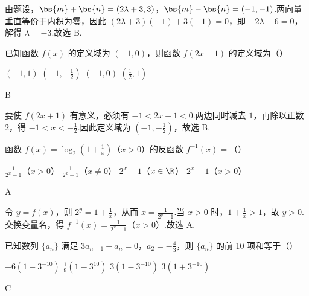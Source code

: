\begin{solution}
由题设，\(\bs{m}+\bs{n}=(2\lambda+3,3)\)，\(\bs{m}-\bs{n}=(-1,-1)\).两向量垂直等价于内积为零，因此 \((2\lambda+3)(-1)+3(-1)=0\)，即 \(-2\lambda-6=0\)，解得 \(\lambda=-3\).故选 B.
\end{solution}

\begin{problem}
已知函数 \(f(x)\) 的定义域为 \((-1,0)\)，则函数 \(f(2x+1)\) 的定义域为（\quad）

\choices
    {\((-1,1)\)}
    {\(\left(-1,-\frac{1}{2}\right)\)}
    {\((-1,0)\)}
    {\(\left(\frac{1}{2},1\right)\)}
\end{problem}

\begin{answer}
B
\end{answer}

\begin{solution}
要使 \(f(2x+1)\) 有意义，必须有 \(-1<2x+1<0\).两边同时减去 \(1\)，再除以正数 \(2\)，得 \(-1<x<-\frac{1}{2}\).因此定义域为 \(\left(-1,-\frac{1}{2}\right)\)，故选 B.
\end{solution}

\begin{problem}
函数 \(f(x)=\log_2\left(1+\frac{1}{x}\right)\)（\(x>0\)）的反函数 \(f^{-1}(x)=\)（\quad）

\choices
    {\(\frac{1}{2^x-1}\)（\(x>0\)）}
    {\(\frac{1}{2^x-1}\)（\(x\neq0\)）}
    {\(2^x-1\)（\(x\in\R\)）}
    {\(2^x-1\)（\(x>0\)）}
\end{problem}

\begin{answer}
A
\end{answer}

\begin{solution}
令 \(y=f(x)\)，则 \(2^y=1+\frac{1}{x}\)，从而 \(x=\frac{1}{2^y-1}\).当 \(x>0\) 时，\(1+\frac{1}{x}>1\)，故 \(y>0\).交换变量名，得 \(f^{-1}(x)=\frac{1}{2^x-1}\)（\(x>0\)）.故选 A.
\end{solution}

\begin{problem}
已知数列 \(\{a_n\}\) 满足 \(3a_{n+1}+a_n=0\)，\(a_2=-\frac{4}{3}\)，则 \(\{a_n\}\) 的前 10 项和等于（\quad）

\choices
    {\(-6(1-3^{-10})\)}
    {\(\frac{1}{9}(1-3^{10})\)}
    {\(3(1-3^{-10})\)}
    {\(3(1+3^{-10})\)}
\end{problem}

\begin{answer}
C
\end{answer}

